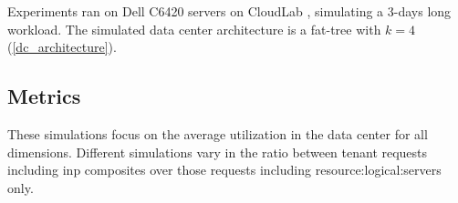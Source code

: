Experiments ran on Dell C6420 servers on CloudLab \cite{cloudlab}, simulating a 3-days long workload. %
The simulated data center architecture is a fat-tree with $k=4$ (\autoref{dc_architecture}).

\subsection{Metrics}
These simulations focus on the average  utilization in the data center for all dimensions.
Different simulations vary in the ratio between tenant requests including \gls{inp} composites over those requests including \glspl{resource:logical:server} only.